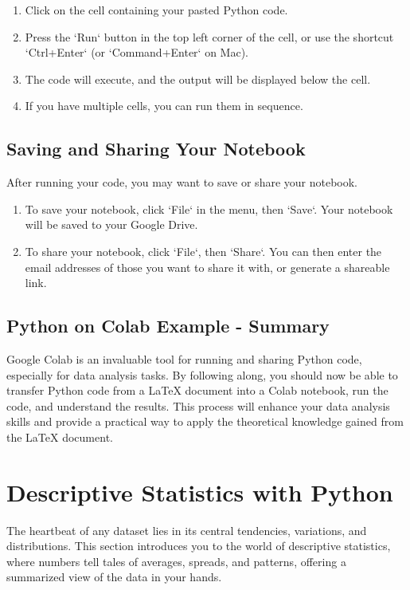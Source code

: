 \documentclass[a4paper,12pt]{book}
\begin{document}
\begin{enumerate}
    \item Click on the cell containing your pasted Python code.
    \item Press the `Run` button in the top left corner of the cell, or use the shortcut `Ctrl+Enter` (or `Command+Enter` on Mac).
    \item The code will execute, and the output will be displayed below the cell.
    \item If you have multiple cells, you can run them in sequence.
\end{enumerate}

\subsection{Saving and Sharing Your Notebook}
After running your code, you may want to save or share your notebook.

\begin{enumerate}
    \item To save your notebook, click `File` in the menu, then `Save`. Your notebook will be saved to your Google Drive.
    \item To share your notebook, click `File`, then `Share`. You can then enter the email addresses of those you want to share it with, or generate a shareable link.
\end{enumerate}

\subsection{Python on Colab Example - Summary}
Google Colab is an invaluable tool for running and sharing Python code, especially for data analysis tasks. By following along, you should now be able to transfer Python code from a LaTeX document into a Colab notebook, run the code, and understand the results. This process will enhance your data analysis skills and provide a practical way to apply the theoretical knowledge gained from the LaTeX document.

\section{Descriptive Statistics with Python}
The heartbeat of any dataset lies in its central tendencies, variations, and distributions. This section introduces you to the world of descriptive statistics, where numbers tell tales of averages, spreads, and patterns, offering a summarized view of the data in your hands.
\end{document}
